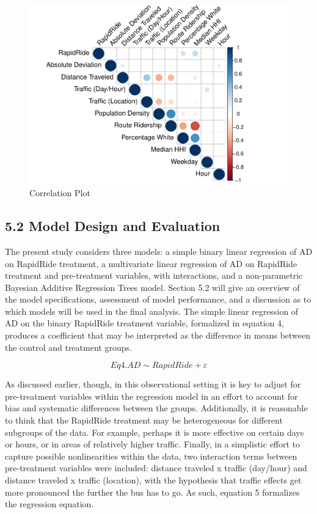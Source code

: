 \documentclass[
  12pt,
]{article}
\begin{document}
\begin{figure}
\centering
\includegraphics{thesis-draft-1_files/figure-latex/unnamed-chunk-10-1.pdf}
\caption{Correlation Plot}
\end{figure}

\subsection{5.2 Model Design and
Evaluation}\label{model-design-and-evaluation}

The present study considers three models: a simple binary linear
regression of AD on RapidRide treatment, a multivariate linear
regression of AD on RapidRide treatment and pre-treatment variables,
with interactions, and a non-parametric Bayesian Additive Regression
Trees model. Section 5.2 will give an overview of the model
specifications, assessment of model performance, and a discussion as to
which models will be used in the final analysis. The simple linear
regression of AD on the binary RapidRide treatment variable, formalized
in equation 4, produces a coefficient that may be interpreted as the
difference in means between the control and treatment groups.

\[Eq 4. AD \sim RapidRide + \varepsilon\]

As discussed earlier, though, in this observational setting it is key to
adjust for pre-treatment variables within the regression model in an
effort to account for bias and systematic differences between the
groups. Additionally, it is reasonable to think that the RapidRide
treatment may be heterogeneous for different subgroups of the data. For
example, perhaps it is more effective on certain days or hours, or in
areas of relatively higher traffic. Finally, in a simplistic effort to
capture possible nonlinearities within the data, two interaction terms
between pre-treatment variables were included: distance traveled x
traffic (day/hour) and distance traveled x traffic (location), with the
hypothesis that traffic effects get more pronounced the further the bus
has to go. As such, equation 5 formalizes the regression equation.
\end{document}
